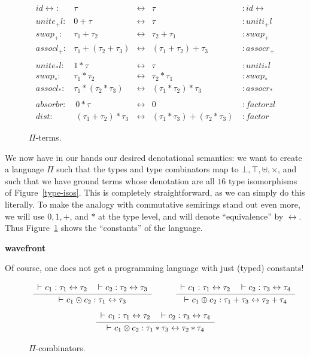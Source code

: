 \documentclass{article}
\newcommand{\identlp}{\mathit{unite}_+\mathit{l}}
\newcommand{\identrp}{\mathit{uniti}_+\mathit{l}}
\newcommand{\swapp}{\mathit{swap}_+}
\newcommand{\assoclp}{\mathit{assocl}_+}
\newcommand{\assocrp}{\mathit{assocr}_+}
\newcommand{\identlt}{\mathit{unite}_*\mathit{l}}
\newcommand{\identrt}{\mathit{uniti}_*\mathit{l}}
\newcommand{\swapt}{\mathit{swap}_*}
\newcommand{\assoclt}{\mathit{assocl}_*}
\newcommand{\assocrt}{\mathit{assocr}_*}
\newcommand{\factorzl}{\mathit{factorzl}}
\newcommand{\dist}{\mathit{dist}}
\newcommand{\factor}{\mathit{factor}}
\newcommand{\distz}{\mathit{absorbr}}
\newcommand{\iso}{\leftrightarrow}
\newcommand{\proves}{\vdash}
\newcommand{\idc}{\mathit{id}\!\!\leftrightarrow}
\newcommand{\Rule}[4]{
\makebox{{\rm #1}
$\displaystyle
\frac{\begin{array}{l}#2 \\\end{array}}
{\begin{array}{l}#3      \\\end{array}}$
 #4}}
\newcommand{\jdg}[3]{#2 \proves_{#1} #3}
\newcommand{\jc}[1]{\fbox{Jacques says:} \textbf{#1}}
\begin{document}
\begin{figure}[t]
\[
\begin{array}{rrcll}
\idc :& \tau & \iso & \tau &: \idc \\
\\
\identlp :&  0 + \tau & \iso & \tau &: \identrp \\
\swapp :&  \tau_1 + \tau_2 & \iso & \tau_2 + \tau_1 &: \swapp \\
\assoclp :&  \tau_1 + (\tau_2 + \tau_3) & \iso & (\tau_1 + \tau_2) + \tau_3 &: \assocrp \\
\\
\identlt :&  1 * \tau & \iso & \tau &: \identrt \\
\swapt :&  \tau_1 * \tau_2 & \iso & \tau_2 * \tau_1 &: \swapt \\
\assoclt :&  \tau_1 * (\tau_2 * \tau_3) & \iso & (\tau_1 * \tau_2) * \tau_3 &: \assocrt \\
\\
\distz :&~ 0 * \tau & \iso & 0 ~ &: \factorzl \\
\dist :&~ (\tau_1 + \tau_2) * \tau_3 & \iso & (\tau_1 * \tau_3) + (\tau_2 * \tau_3)~ &: \factor
\end{array}
\]
\caption{$\Pi$-terms.}
\label{pi-terms}
\end{figure}

We now have in our hands our desired denotational semantics: we want
to create a language $\Pi$ such that the types and type combinators
map to $\bot, \top, \uplus, \times$, and such that we have ground
terms whose denotation are all $16$ type isomorphisms of
Figure~\ref{type-isos}. This is completely straightforward, as
we can simply do this literally. To make the analogy with 
commutative semirings stand out even more, we will use $0, 1, +$, and $*$
at the type level, and will denote ``equivalence'' by $\iso$.
Thus Figure~\ref{pi-terms} shows the ``constants'' of the language.

\jc{wavefront}

Of course, one does not get a programming language with just (typed)
constants!

\begin{figure}[t]
\[
\Rule{}
{\jdg{}{}{c_1 : \tau_1 \iso \tau_2} \quad \vdash c_2 : \tau_2 \iso \tau_3}
{\jdg{}{}{c_1 \odot c_2 : \tau_1 \iso \tau_3}}
{}
\qquad
\Rule{}
{\jdg{}{}{c_1 : \tau_1 \iso \tau_2} \quad \vdash c_2 : \tau_3 \iso \tau_4}
{\jdg{}{}{c_1 \oplus c_2 : \tau_1 + \tau_3 \iso \tau_2 + \tau_4}}
{}
\]
\[
\Rule{}
{\jdg{}{}{c_1 : \tau_1 \iso \tau_2} \quad \vdash c_2 : \tau_3 \iso \tau_4}
{\jdg{}{}{c_1 \otimes c_2 : \tau_1 * \tau_3 \iso \tau_2 * \tau_4}}
{}
\]
\caption{$\Pi$-combinators.}
\label{pi-combinators}
\end{figure}
\end{document}
